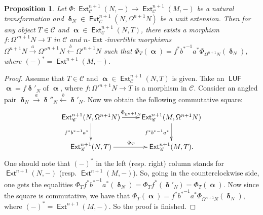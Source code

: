 \documentclass[11pt,a4paper]{amsart}
\newcommand{\rt}{\rightarrow}
\newcommand{\lrt}{\longrightarrow}
\newcommand{\lf}{\leftarrow}
\newcommand{\st}{\stackrel}
\newcommand{\C}{\mathscr{C} }
\newcommand{\p}{\mathfrak{p} }
\def\Ext{\operatorname{{\mathsf{Ext}}}}
\def\syz{\mathsf{\Omega}}
\def\p{\mathcal P}
\def\luf{\operatorname{\mathsf{LUF}}}
\def\al{\operatorname{\boldsymbol{\alpha}}}
\def\be{\operatorname{\boldsymbol{\beta}}}
\def\ga{\operatorname{\boldsymbol{\gamma}}}
\def\ep{\operatorname{\boldsymbol{\epsilon}}}
\def\de{\operatorname{\boldsymbol{\delta}}}
\newtheorem{prop}[theorem]{Proposition}
\theoremstyle{definition}
\newtheorem{rem}[theorem]{Remark}
\theoremstyle{plain}
\theoremstyle{definition}
\numberwithin{equation}{section}
\begin{document}

\begin{prop}\label{epi}Let  $\Phi:\Ext^{n+1}_{\C}(N, -)\rt\Ext^{n+1}_{\C}(M, -)$ be a natural transformation and  $\de_N\in\Ext^{n+1}_{\C}(N, \syz^{n+1}N)$ be a unit extension. Then for any object $T\in\C$ and  $\al\in\Ext^{n+1}_{\C}(N, T)$, there exists a morphism $f:{\syz'}^{n+1}N\rt T$ in $\C$ and $n$-$\Ext$-invertible morphisms  $\syz^{n+1}N\st{a}\rt{\syz''}^{n+1}N\st{b}\lf{\syz'}^{n+1}N$ such that $\Phi_T(\al)=f^*{b^*}^{-1}a^*\Phi_{\syz^{n+1}N}(\de_N)$, where $(-)^*=\Ext^{n+1}(M, -)$.
\end{prop}
\begin{proof}
Assume that $T\in\C$ and $\al\in\Ext^{n+1}_{\C}(N, T)$ is given. Take an $\luf$ $\al=f\de'_N$ of $\al$, where $f:{\syz'}^{n+1}N\rt T$ is a morphism in $\C$. Consider an angled pair $\de_N\st{a}\rt\de''_N\st{b}\lf\de'_N$. Now we obtain the following commutative square:
\[\xymatrix{\Ext^{n+1}_{\C}(N, \syz^{n+1}N)\ar[r]^{\Phi_{\syz^{n+1}N}}\ar[d]_{f^*{b^*}^{-1}a^*} & \Ext^{n+1}_{\C}(M, \syz^{n+1}N)\ar[d]_{f^*{b^*}^{-1}a^*} \\ \Ext^{n+1}_{\C}(N, T)\ar[r]^{\Phi_T} & \Ext^{n+1}_{\C}(M, T).}\]
One should note that $(-)^*$ in the left (resp. right) column stands for $\Ext^{n+1}(N, -)$ (resp. $\Ext^{n+1}(M, -)$). So, going in the counterclockwise side, one gets the equalities $\Phi_T f^*{b^*}^{-1}a^*(\de_N)=\Phi_Tf^*(\de'_N)=\Phi_T(\al)$. Now since the square is commutative, we have that $\Phi_T(\al)=f^*{b^*}^{-1}a^*\Phi_{\syz^{n+1}N}(\de_N)$, where $(-)^*=\Ext^{n+1}(M, -)$. So the proof is finished.
\end{proof}
\end{document}

